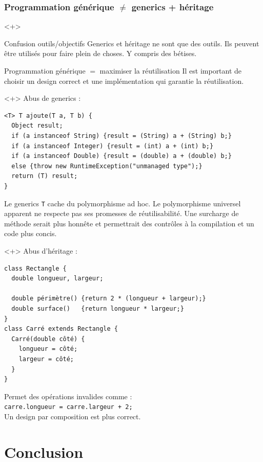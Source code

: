 \documentclass[draft]{beamer}
\begin{document}
\begin{frame}[fragile]
\frametitle{Programmation générique $\neq$ generics + héritage}
\begin{onlyenv}<+>
  \begin{alertblock}{Confusion outils/objectifs}
    Generics et héritage ne sont que des outils. Ils peuvent être utilisés pour faire plein de choses. Y compris des bétises.
  \end{alertblock}
  \begin{exampleblock}{Programmation générique $=$ maximiser la réutilisation}
    Il est important de choisir un design correct et une implémentation qui garantie la réutilisation.
  \end{exampleblock}
\end{onlyenv}
\begin{onlyenv}<+>
  Abus de generics :
  \begin{lstlisting}
<T> T ajoute(T a, T b) {
  Object result;
  if (a instanceof String) {result = (String) a + (String) b;}
  if (a instanceof Integer) {result = (int) a + (int) b;}
  if (a instanceof Double) {result = (double) a + (double) b;}
  else {throw new RuntimeException("unmanaged type");}
  return (T) result;
}
  \end{lstlisting}
  Le generics \lstinline{T} cache du polymorphisme ad hoc.
  Le polymorphisme universel apparent ne respecte pas ses promesses de réutilisabilité.
  Une surcharge de méthode serait plus honnête et permettrait des contrôles à la compilation et un code plus concis.
\end{onlyenv}
\begin{onlyenv}<+>
  Abus d'héritage :
  \begin{lstlisting}
class Rectangle {
  double longueur, largeur;
  
  double périmètre() {return 2 * (longueur + largeur);}
  double surface()   {return longueur * largeur;}
}
class Carré extends Rectangle {
  Carré(double côté) {
    longueur = côté;
    largeur = côté;
  }
}
  \end{lstlisting}
  Permet des opérations invalides comme :\\
  \lstinline{carre.longueur = carre.largeur + 2;}\\
  Un design par composition est plus correct.
\end{onlyenv}
\end{frame}

\section{Conclusion}
\end{document}

